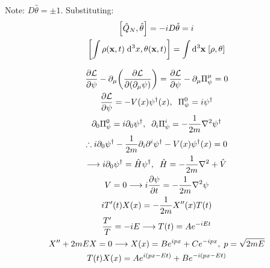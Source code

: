 \documentclass{report}
\theoremstyle{definition}
\begin{document}
\begin{chapter12}
	Note: $D\hat{\theta} = \pm 1$. Substituting:
	\begin{gather*}
		\bqty{\hat{Q}_N, \hat{\theta}} = -iD\hat{\theta} = i \\
		\bqty{\int\rho({\bf x},t)\; \dd^3{x}, \theta({\bf x},t)} = \int\dd^3{\bf x}\;\bqty{\rho,\theta}
	\end{gather*}
\end{chapter12}

\begin{chapter12}
	\begin{gather*}
		\pdv{\mathcal L}{\psi} - \partial_{\mu}\pqty{\pdv{\mathcal L}{\pqty{\partial_{\mu}\psi}}} = \pdv{\mathcal L}{\psi} - \partial_{\mu}\Pi^{\mu}_{\psi} = 0 \\
		\pdv{\mathcal L}{\psi} = -V(x)\psi^{\dagger}(x), \;\; \Pi^0_{\psi} = i\psi^{\dagger} \\
		\partial_0\Pi^0_{\psi} = i\partial_0 \psi^{\dagger}, \;\; \partial_i \Pi^i_{\psi} = -\frac{1}{2m}\nabla^2\psi^{\dagger}\\
		\therefore i\partial_0 \psi^{\dagger} -\frac{1}{2m}\partial_i\partial^i\psi^{\dagger} - V(x)\psi^{\dagger}(x) = 0 \\
		\longrightarrow i\partial_0\psi^{\dagger} = \hat{H}\psi^{\dagger}, \;\; \hat{H} = -\frac{1}{2m}\nabla^2 + \hat{V} \\
		V = 0 \longrightarrow i\pdv{\psi}{t} = -\frac{1}{2m}\nabla^2\psi \\
		iT'(t)X(x) = -\frac{1}{2m}X''(x)T(t) \\
		\frac{T'}{T} = -iE \longrightarrow T(t) = Ae^{-iEt} \\
		X'' + 2mEX = 0 \longrightarrow X(x) = Be^{ipx} + Ce^{-ipx},\; p = \sqrt{2mE} \\
		T(t)X(x) = Ae^{i(px-Et)} + Be^{-i(px - Et)}
	\end{gather*}
\end{chapter12}
\end{document}
